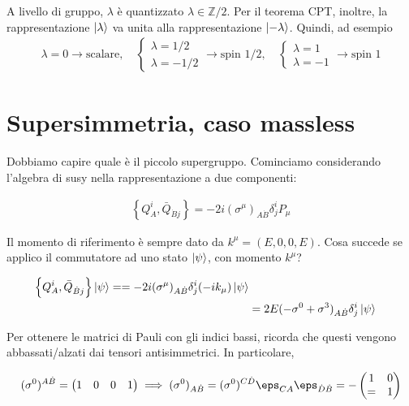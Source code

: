 \documentclass{report}
\begin{document}
\begin{enumerate}
    A livello di gruppo, \(\lambda\) è quantizzato \(\lambda \in \mathbb{Z}/2\). Per il teorema CPT, inoltre, la rappresentazione \(\ket{\lambda}\) va unita alla rappresentazione \(\ket{-\lambda}\). Quindi, ad esempio 
    \begin{align}
        \lambda = 0 \to \text{scalare}, \quad 
        \begin{cases}
            \lambda = 1/2 \\ \lambda = -1/2
        \end{cases} \to \text{spin 1/2}, \quad 
        \begin{cases}
            \lambda = 1 \\ \lambda = -1 
        \end{cases} \to \text{spin 1}
    \end{align}
\end{enumerate}


\section{Supersimmetria, caso massless}

Dobbiamo capire quale è il piccolo supergruppo. Cominciamo considerando l'algebra di susy nella rappresentazione a due componenti: 

\begin{align}
    \left\{Q_A^i, \bar{Q}_{\dot{B}j} \right\} = -2i (\sigma^\mu)_{A\dot{B}}\delta^i_j P_\mu
\end{align}

Il momento di riferimento è sempre dato da \(k^\mu = (E, 0, 0, E)\). Cosa succede se applico il commutatore ad uno stato \(\ket{\psi}\), con momento \(k^\mu\)? 

\begin{align}
    \left\{Q_A^i, \bar{Q}_{\dot{B}j} \right\}\ket{\psi} == -2i(\sigma^\mu)_{A\dot{B}}\delta^i_j (-ik_\mu)\ket{\psi} \notag \\ 
    &= 2E (-\sigma^0 +\sigma^3)_{A\dot{B}}\delta^i_j \ket{\psi}
\end{align}

Per ottenere le matrici di Pauli con gli indici bassi, ricorda che questi vengono abbassati/alzati dai tensori antisimmetrici. In particolare, 

\begin{align}
    (\sigma^0)^{A\dot{B}} = \begin{pmatrix}
        1 & 0 & 0 & 1 
    \end{pmatrix} \implies (\sigma^0)_{A\dot{B}} = (\sigma^0)^{C\dot{D}}\eps_{CA}\eps_{\dot{D}\dot{B}} = -\begin{pmatrix}
        1 & 0 \\ = &  1
    \end{pmatrix}
\end{align}
\end{document}

